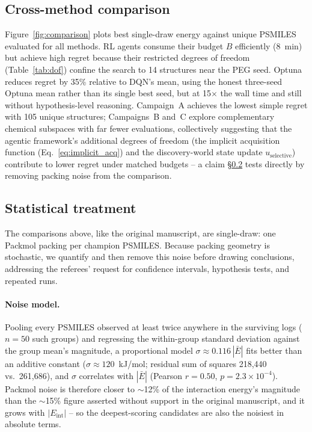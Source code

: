 \documentclass[twocolumn]{fairmeta}
\begin{document}
\subsection{Cross-method comparison}

Figure~\ref{fig:comparison} plots best single-draw energy against unique PSMILES evaluated for all methods.
RL agents consume their budget $B$ efficiently (8~min) but achieve high regret because their restricted degrees of freedom (Table~\ref{tab:dof}) confine the search to 14 structures near the PEG seed.
Optuna reduces regret by 35\% relative to DQN's mean, using the honest three-seed Optuna mean rather than its single best seed, but at 15$\times$ the wall time and still without hypothesis-level reasoning.
Campaign~A achieves the lowest simple regret with 105 unique structures; Campaigns~B and~C explore complementary chemical subspaces with far fewer evaluations, collectively suggesting that the agentic framework's additional degrees of freedom (the implicit acquisition function (Eq.~\ref{eq:implicit_acq}) and the discovery-world state update $u_\text{selective}$) contribute to lower regret under matched budgets -- a claim \S\ref{sec:stats} tests directly by removing packing noise from the comparison.

\subsection{Statistical treatment}
\label{sec:stats}

The comparisons above, like the original manuscript, are single-draw: one Packmol packing per champion PSMILES.
Because packing geometry is stochastic, we quantify and then remove this noise before drawing conclusions, addressing the referees' request for confidence intervals, hypothesis tests, and repeated runs.

\paragraph{Noise model.}
Pooling every PSMILES observed at least twice anywhere in the surviving logs ($n{=}50$ such groups) and regressing the within-group standard deviation against the group mean's magnitude, a proportional model $\sigma \approx 0.116\,|\bar{E}|$ fits better than an additive constant ($\sigma \approx 120$~kJ/mol; residual sum of squares 218{,}440 vs.\ 261{,}686), and $\sigma$ correlates with $|\bar{E}|$ (Pearson $r{=}0.50$, $p{=}2.3{\times}10^{-4}$).
Packmol noise is therefore closer to ${\sim}$12\% of the interaction energy's magnitude than the ${\sim}$15\% figure asserted without support in the original manuscript, and it grows with $|E_\text{int}|$ -- so the deepest-scoring candidates are also the noisiest in absolute terms.
\end{document}
